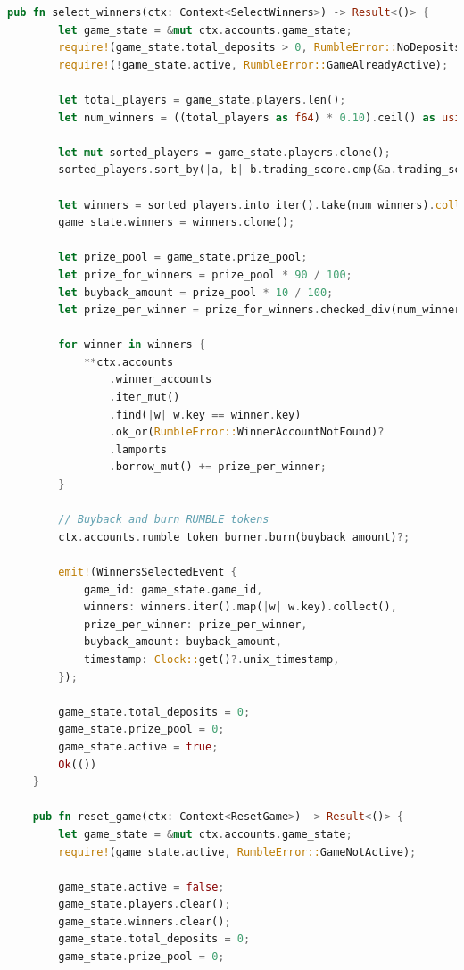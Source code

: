 \documentclass[11pt,a4paper]{article}
\begin{document}
\begin{lstlisting}[language=Rust, caption={Solana Smart Contract for RUMBLE}]
    pub fn select_winners(ctx: Context<SelectWinners>) -> Result<()> {
        let game_state = &mut ctx.accounts.game_state;
        require!(game_state.total_deposits > 0, RumbleError::NoDeposits);
        require!(!game_state.active, RumbleError::GameAlreadyActive);

        let total_players = game_state.players.len();
        let num_winners = ((total_players as f64) * 0.10).ceil() as usize;

        let mut sorted_players = game_state.players.clone();
        sorted_players.sort_by(|a, b| b.trading_score.cmp(&a.trading_score));

        let winners = sorted_players.into_iter().take(num_winners).collect::<Vec<_>>();
        game_state.winners = winners.clone();

        let prize_pool = game_state.prize_pool;
        let prize_for_winners = prize_pool * 90 / 100;
        let buyback_amount = prize_pool * 10 / 100;
        let prize_per_winner = prize_for_winners.checked_div(num_winners as u64).ok_or(RumbleError::DivisionByZero)?;

        for winner in winners {
            **ctx.accounts
                .winner_accounts
                .iter_mut()
                .find(|w| w.key == winner.key)
                .ok_or(RumbleError::WinnerAccountNotFound)?
                .lamports
                .borrow_mut() += prize_per_winner;
        }

        // Buyback and burn RUMBLE tokens
        ctx.accounts.rumble_token_burner.burn(buyback_amount)?;

        emit!(WinnersSelectedEvent {
            game_id: game_state.game_id,
            winners: winners.iter().map(|w| w.key).collect(),
            prize_per_winner: prize_per_winner,
            buyback_amount: buyback_amount,
            timestamp: Clock::get()?.unix_timestamp,
        });

        game_state.total_deposits = 0;
        game_state.prize_pool = 0;
        game_state.active = true;
        Ok(())
    }

    pub fn reset_game(ctx: Context<ResetGame>) -> Result<()> {
        let game_state = &mut ctx.accounts.game_state;
        require!(game_state.active, RumbleError::GameNotActive);

        game_state.active = false;
        game_state.players.clear();
        game_state.winners.clear();
        game_state.total_deposits = 0;
        game_state.prize_pool = 0;


\end{lstlisting}
\end{document}
